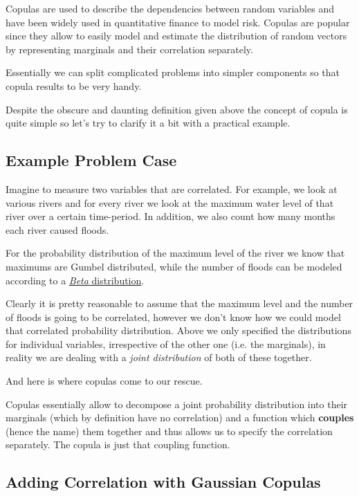Copulas are used to describe the dependencies between random variables and
have been widely used in quantitative finance to model risk. Copulas are popular since
they allow to easily model and estimate the distribution of random
vectors by representing marginals and their correlation separately.

Essentially we can split complicated problems into simpler components so that copula results to be very handy.

Despite the obscure and daunting definition given above the concept of copula is
quite simple so let's try to clarify it a bit with a practical example.

\subsection{Example Problem Case}\label{example-problem-case}

Imagine to measure two variables that are 
correlated. For example, we look at various rivers and for every river
we look at the maximum water level of that river over a certain
time-period. In addition, we also count how many months each river
caused floods.

For the probability distribution of the maximum level of the river we
know that maximums are Gumbel distributed, while the number of floods
can be modeled according to a
\href{https://en.wikipedia.org/wiki/Beta_distribution}{\emph{Beta}
distribution}.

Clearly it is pretty reasonable to assume that the maximum level and the
number of floods is going to be correlated, however we don't know how
we could model that correlated probability distribution.
Above we only
specified the distributions for individual variables, irrespective of
the other one (i.e. the marginals), in reality we are dealing with a
\emph{joint distribution} of both of these together.

And here is where copulas come to our rescue.

Copulas essentially allow to decompose a joint probability distribution
into their marginals (which by definition have no correlation) and a
function which \textbf{couples} (hence the name) them together and thus allows us
to specify the correlation separately. The copula is just that coupling
function.

\subsection{Adding Correlation with Gaussian Copulas}\label{adding-correlation-with-gaussian-copulas}

